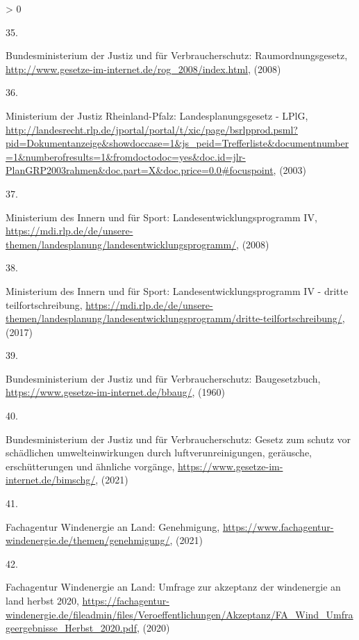 \documentclass[a4paper,11pt]{article}
\newlength{\cslhangindent}
\newlength{\csllabelwidth}
\newenvironment{CSLReferences}[3] %
 {%
  \setlength{\parindent}{0pt}
  \ifodd #1 \everypar{\setlength{\hangindent}{\cslhangindent}}\ignorespaces\fi
  \ifnum #2 > 0
  \setlength{\parskip}{#2\baselineskip}
  \fi
 }%
 {}
\newcommand{\CSLLeftMargin}[1]{\parbox[t]{\maxof{\widthof{#1}}{\csllabelwidth}}{#1}}
\newcommand{\CSLRightInline}[1]{\parbox[t]{\linewidth}{#1}}
\begin{document}
\begin{CSLReferences}{0}{0}
\leavevmode\hypertarget{ref-BundesministeriumderJustizundfurVerbraucherschutz.2008}{}%
\CSLLeftMargin{35. }
\CSLRightInline{Bundesministerium der Justiz und für Verbraucherschutz: Raumordnungsgesetz, \url{http://www.gesetze-im-internet.de/rog_2008/index.html}, (2008)}

\leavevmode\hypertarget{ref-MinisteriumderJustizRheinlandPfalz.2003}{}%
\CSLLeftMargin{36. }
\CSLRightInline{Ministerium der Justiz Rheinland-Pfalz: Landesplanungsgesetz - LPlG, \url{http://landesrecht.rlp.de/jportal/portal/t/xic/page/bsrlpprod.psml?pid=Dokumentanzeige\&showdoccase=1\&js_peid=Trefferliste\&documentnumber=1\&numberofresults=1\&fromdoctodoc=yes\&doc.id=jlr-PlanGRP2003rahmen\&doc.part=X\&doc.price=0.0\#focuspoint}, (2003)}

\leavevmode\hypertarget{ref-MinisteriumdesInnernundfurSport.2008}{}%
\CSLLeftMargin{37. }
\CSLRightInline{Ministerium des Innern und für Sport: Landesentwicklungsprogramm IV, \url{https://mdi.rlp.de/de/unsere-themen/landesplanung/landesentwicklungsprogramm/}, (2008)}

\leavevmode\hypertarget{ref-MinisteriumdesInnernundfurSport.2017}{}%
\CSLLeftMargin{38. }
\CSLRightInline{Ministerium des Innern und für Sport: Landesentwicklungsprogramm IV - dritte teilfortschreibung, \url{https://mdi.rlp.de/de/unsere-themen/landesplanung/landesentwicklungsprogramm/dritte-teilfortschreibung/}, (2017)}

\leavevmode\hypertarget{ref-BundesministeriumderJustizundfurVerbraucherschutz.1960}{}%
\CSLLeftMargin{39. }
\CSLRightInline{Bundesministerium der Justiz und für Verbraucherschutz: Baugesetzbuch, \url{https://www.gesetze-im-internet.de/bbaug/}, (1960)}

\leavevmode\hypertarget{ref-BundesministeriumderJustizundfurVerbraucherschutz.2021}{}%
\CSLLeftMargin{40. }
\CSLRightInline{Bundesministerium der Justiz und für Verbraucherschutz: Gesetz zum schutz vor sch{ä}dlichen umwelteinwirkungen durch luftverunreinigungen, ger{ä}usche, ersch{ü}tterungen und {ä}hnliche vorg{ä}nge, \url{https://www.gesetze-im-internet.de/bimschg/}, (2021)}

\leavevmode\hypertarget{ref-FachagenturWindenergieanLand.2021}{}%
\CSLLeftMargin{41. }
\CSLRightInline{Fachagentur Windenergie an Land: Genehmigung, \url{https://www.fachagentur-windenergie.de/themen/genehmigung/}, (2021)}

\leavevmode\hypertarget{ref-FachagenturWindenergieanLand.2020}{}%
\CSLLeftMargin{42. }
\CSLRightInline{Fachagentur Windenergie an Land: Umfrage zur akzeptanz der windenergie an land herbst 2020, \url{https://fachagentur-windenergie.de/fileadmin/files/Veroeffentlichungen/Akzeptanz/FA_Wind_Umfrageergebnisse_Herbst_2020.pdf}, (2020)}


\end{CSLReferences}
\end{document}
